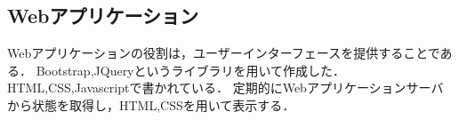 \subsection{Webアプリケーション}
Webアプリケーションの役割は，ユーザーインターフェースを提供することである．
Bootstrap,JQueryというライブラリを用いて作成した．HTML,CSS,Javascriptで書かれている．
定期的にWebアプリケーションサーバから状態を取得し，HTML,CSSを用いて表示する．

